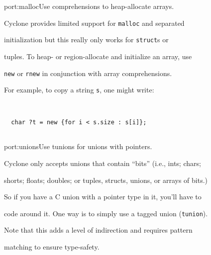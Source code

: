 \begin{porta}{port:malloc}{Use comprehensions to heap-allocate arrays.}





Cyclone provides limited support for \texttt{malloc} and separated


initialization but this really only works for \texttt{struct}s or


tuples.  To heap- or region-allocate and initialize an array, use


\texttt{new} or \texttt{rnew} in conjunction with array comprehensions.  


For example, to copy a string \texttt{s}, one might write:


\begin{verbatim}


  char ?t = new {for i < s.size : s[i]};


\end{verbatim}








\end{porta}





\begin{porta}{port:unions}{Use tunions for unions with pointers.}





Cyclone only accepts unions that contain ``bits'' (i.e., ints; chars;


shorts; floats; doubles; or tuples, structs, unions, or arrays of bits.)


So if you have a C union with a pointer type in it, you'll have to


code around it.  One way is to simply use a tagged union (\texttt{tunion}).


Note that this adds a level of indirection and requires pattern


matching to ensure type-safety.  





\end{porta}





